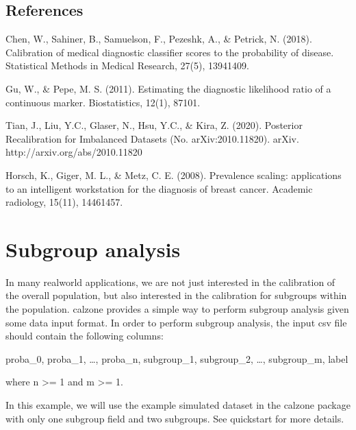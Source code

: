 \documentclass[letterpaper,10pt,english]{sphinxmanual}
\begin{document}
\section{References}
\label{\detokenize{notebooks/prevalence_adjustment:References}}
\sphinxAtStartPar
Chen, W., Sahiner, B., Samuelson, F., Pezeshk, A., \& Petrick, N. (2018). Calibration of medical diagnostic classifier scores to the probability of disease. Statistical Methods in Medical Research, 27(5), 1394\textendash{}1409. 

\sphinxAtStartPar
Gu, W., \& Pepe, M. S. (2011). Estimating the diagnostic likelihood ratio of a continuous marker. Biostatistics, 12(1), 87\textendash{}101. 

\sphinxAtStartPar
Tian, J., Liu, Y.\sphinxhyphen{}C., Glaser, N., Hsu, Y.\sphinxhyphen{}C., \& Kira, Z. (2020). Posterior Re\sphinxhyphen{}calibration for Imbalanced Datasets (No. arXiv:2010.11820). arXiv. http://arxiv.org/abs/2010.11820

\sphinxAtStartPar
Horsch, K., Giger, M. L., \& Metz, C. E. (2008). Prevalence scaling: applications to an intelligent workstation for the diagnosis of breast cancer. Academic radiology, 15(11), 1446\textendash{}1457. 

\sphinxstepscope


\chapter{Subgroup analysis}
\label{\detokenize{notebooks/subgroup:Subgroup-analysis}}\label{\detokenize{notebooks/subgroup::doc}}
\sphinxAtStartPar
In many real\sphinxhyphen{}world applications, we are not just interested in the calibration of the overall population, but also interested in the calibration for subgroups within the population. calzone provides a simple way to perform subgroup analysis given some data input format. In order to perform subgroup analysis, the input csv file should contain the following columns:

\sphinxAtStartPar
proba\_0, proba\_1, …, proba\_n, subgroup\_1, subgroup\_2, …, subgroup\_m, label

\sphinxAtStartPar
where n \textgreater{}= 1 and m \textgreater{}= 1.

\sphinxAtStartPar
In this example, we will use the example simulated dataset in the calzone package with only one subgroup field and two subgroups. See quickstart for more details.
\end{document}
